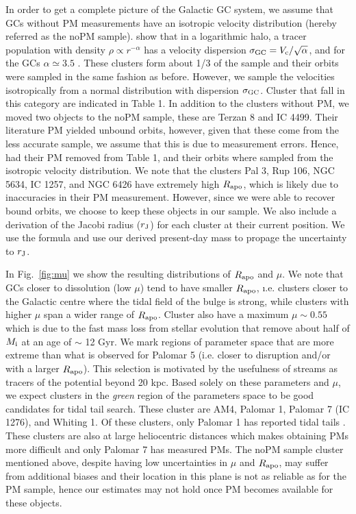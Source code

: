 \documentclass[useAMS,usenatbib,fleqn]{mnras}
\newcommand{\Mi}{M_{\rm i}}
\newcommand{\rj}{r_{\rm J}}
\newcommand{\rapo}{R_{\rm apo}}
\newcommand{\comm}[1]{#1}
\begin{document}
In order to get a complete picture of the Galactic GC system, we assume that GCs
without PM measurements have an  isotropic velocity distribution (hereby
referred as the noPM sample). \citet{vandenBosch99} show that in a logarithmic
halo, a tracer population with density $\rho\propto r^{-\alpha}$ has a velocity
dispersion $\sigma_{\rm GC}= V_{\rm c}/\sqrt{\alpha}$, and for the GCs
$\alpha\simeq3.5$ \citep{Harris76}. These clusters form about 1/3 of the sample
and their orbits were sampled in the same fashion as before. However, we sample
the velocities isotropically from a normal distribution with dispersion
$\sigma_{\rm GC}$. Cluster that fall in this category are indicated in Table 1.
\comm{In addition to the clusters without PM, we moved two objects to the noPM
sample, these are Terzan 8 and IC 4499. Their literature PM yielded unbound
orbits, however, given that these come from the less accurate \citet{Dambis06}
sample, we assume that this is due to measurement errors.  Hence, had their PM
removed from Table 1, and their orbits where sampled from the isotropic velocity
distribution. We note that the clusters Pal 3, Rup 106, NGC 5634, IC 1257, and
NGC 6426 have extremely high $\rapo$, which is likely due to inaccuracies in
their PM measurement. However, since we were able to recover bound orbits, we
choose to keep these objects in our sample.  We also include a derivation of the
Jacobi radius ($\rj$) for each cluster at their current position. We use the
\citet{King62} formula and use our derived present-day mass to propage the
uncertainty to $\rj$.}

In Fig.~\ref{fig:mu} we show the resulting distributions of $\rapo$ and $\mu$.
We note that GCs closer to dissolution (low $\mu$) tend to have smaller $\rapo$,
{\i.e. clusters closer to the Galactic centre where the tidal field of the bulge
is strong}, while clusters with higher $\mu$ span a wider range of $\rapo$.
{Cluster also have a maximum $\mu \sim 0.55$ which is due to the fast mass loss
from stellar evolution that remove about half of $\Mi$ at an age of \comm{$\sim$
12 Gyr.}}  We mark regions of  parameter space that are more extreme than what
is observed for Palomar 5 (i.e. closer to disruption and/or with a larger
$\rapo$). \comm{This selection is motivated by the usefulness of streams as
tracers of the potential beyond 20 kpc.} Based solely on these parameters and
$\mu$, we expect clusters in the \emph{green} region of the parameters space to
be good candidates for tidal tail search. These cluster are AM4, Palomar 1,
Palomar 7 (IC 1276), and Whiting 1.  Of these clusters, only Palomar 1 has
reported tidal tails \citep{pal1}.  These clusters are also at large
heliocentric distances which makes obtaining PMs more difficult and only Palomar
7 has measured PMs. The noPM sample cluster mentioned above, despite having low
uncertainties in $\mu$ and $\rapo$, may suffer from additional biases and their
location in this plane is not as reliable as for the PM sample, hence our
estimates may not hold once PM becomes available for these objects.
\end{document}
